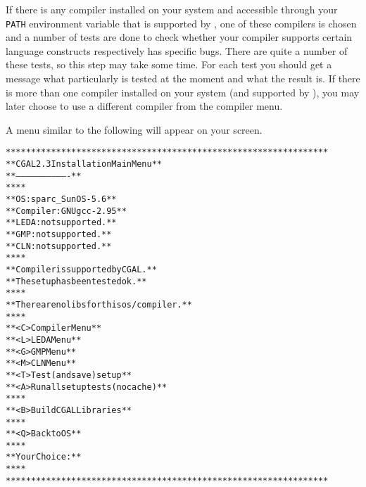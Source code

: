 If there is any compiler installed on your system and accessible
through your \texttt{PATH} environment variable that is supported by
\cgal, one of these compilers is chosen and a number of tests are done
to check whether your compiler supports certain language constructs
respectively has specific bugs. There are quite a number of these
tests, so this step may take some time. For each test you should get a
message what particularly is tested at the moment and what the result
is. If there is more than one compiler installed on your system (and
supported by \cgal), you may later choose to use a different compiler
from the compiler menu.

A menu similar to the following will appear on your screen.

{\ccTexHtml{\scriptsize}{} \label{pic:main-menu}
\begin{alltt}
  ****************************************************************
  **              CGAL 2.3 Installation Main Menu               **
  **              -------------------------------               **
  **                                                            **
  **   OS:                  sparc_SunOS-5.6                     **
  **   Compiler:            GNU gcc-2.95                        **
  **   LEDA:                not supported.                      **
  **   GMP:                 not supported.                      **
  **   CLN:                 not supported.                      **
  **                                                            **
  **   Compiler is supported by CGAL.                           **
  **   The setup has been tested ok.                            **
  **                                                            **
  **   There are no libs for this os/compiler.                  **
  **                                                            **
  **   <C>  Compiler Menu                                       **
  **   <L>  LEDA Menu                                           **
  **   <G>  GMP Menu                                            **
  **   <M>  CLN Menu                                            **
  **   <T>  Test (and save) setup                               **
  **   <A>  Run all setup tests (no cache)                      **
  **                                                            **
  **   <B>  Build CGAL Libraries                                **
  **                                                            **
  **   <Q>  Back to OS                                          **
  **                                                            **
  **   Your Choice:                                             **
  **                                                            **
  ****************************************************************
\end{alltt}}

